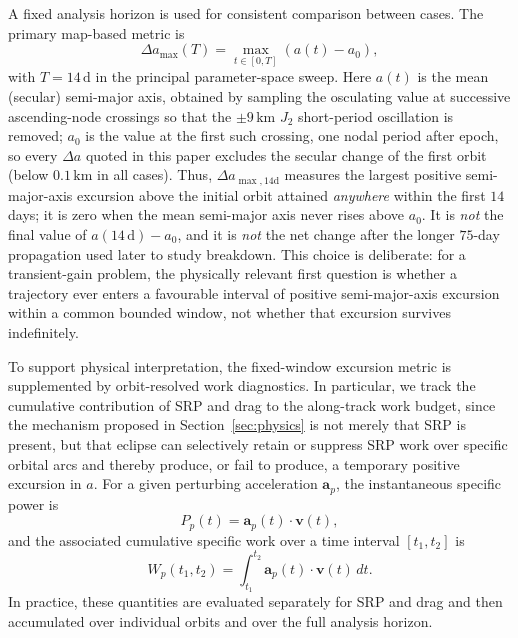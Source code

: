 \par\noindent A fixed analysis horizon is used for consistent comparison between cases. The primary map-based metric is
\begin{equation}
\Delta a_{\max}(T) = \max_{t \in [0,T]} \left(a(t)-a_0\right),
\end{equation}
with \(T=14\,\mathrm{d}\) in the principal parameter-space sweep. Here \(a(t)\) is the mean (secular) semi-major axis, obtained by sampling the osculating value at successive ascending-node crossings so that the \(\pm 9\,\mathrm{km}\) \(J_2\) short-period oscillation is removed; \(a_0\) is the value at the first such crossing, one nodal period after epoch, so every \(\Delta a\) quoted in this paper excludes the secular change of the first orbit (below \(0.1\,\mathrm{km}\) in all cases). Thus, \(\Delta a_{\max,14\mathrm{d}}\) measures the largest positive semi-major-axis excursion above the initial orbit attained \emph{anywhere} within the first \(14\) days; it is zero when the mean semi-major axis never rises above \(a_0\). It is \emph{not} the final value of \(a(14\,\mathrm{d})-a_0\), and it is \emph{not} the net change after the longer \(75\)-day propagation used later to study breakdown. This choice is deliberate: for a transient-gain problem, the physically relevant first question is whether a trajectory ever enters a favourable interval of positive semi-major-axis excursion within a common bounded window, not whether that excursion survives indefinitely.


\vspace{5pt}
\par\noindent To support physical interpretation, the fixed-window excursion metric is supplemented by orbit-resolved work diagnostics. In particular, we track the cumulative contribution of SRP and drag to the along-track work budget, since the mechanism proposed in Section~\ref{sec:physics} is not merely that SRP is present, but that eclipse can selectively retain or suppress SRP work over specific orbital arcs and thereby produce, or fail to produce, a temporary positive excursion in \(a\). For a given perturbing acceleration \(\mathbf{a}_{p}\), the instantaneous specific power is
\begin{equation}
P_{p}(t) = \mathbf{a}_{p}(t)\cdot\mathbf{v}(t),
\end{equation}
and the associated cumulative specific work over a time interval \([t_1,t_2]\) is
\begin{equation}
W_{p}(t_1,t_2) = \int_{t_1}^{t_2} \mathbf{a}_{p}(t)\cdot\mathbf{v}(t)\,dt.
\end{equation}
In practice, these quantities are evaluated separately for SRP and drag and then accumulated over individual orbits and over the full analysis horizon.

